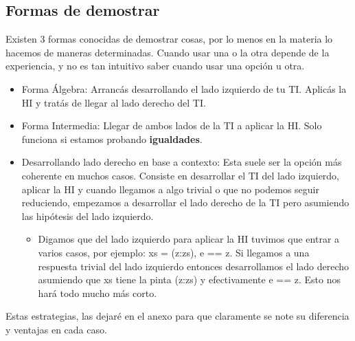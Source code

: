 \documentclass[10pt,a4paper]{article}
\begin{document}
\subsection*{Formas de demostrar}
Existen 3 formas conocidas de demostrar cosas, por lo menos en la materia lo hacemos de maneras determinadas. Cuando usar una o la otra depende de la experiencia, y no es tan intuitivo saber cuando usar una opción u otra. 
\begin{itemize}
    \item Forma Álgebra: Arrancás desarrollando el lado izquierdo de tu TI. Aplicás la HI y tratás de llegar al lado derecho del TI.
    \item Forma Intermedia: Llegar de ambos lados de la TI a aplicar la HI. Solo funciona si estamos probando \textbf{igualdades}.
    \item Desarrollando lado derecho en base a contexto: Esta suele ser la opción más coherente en muchos casos. Consiste en desarrollar el TI del lado izquierdo, aplicar la HI y cuando llegamos a algo trivial o que no podemos seguir reduciendo, empezamos a desarrollar el lado derecho de la TI pero asumiendo las hipótesis del lado izquierdo. 
    \begin{itemize}
        \item Digamos que del lado izquierdo para aplicar la HI tuvimos que entrar a varios casos, por ejemplo: xs = (z:zs), e == z. Si llegamos a una respuesta trivial del lado izquierdo entonces desarrollamos el lado derecho asumiendo que xs tiene la pinta (z:zs) y efectivamente e == z. Esto nos hará todo mucho más corto.  
    \end{itemize}
\end{itemize}
Estas estrategias, las dejaré en el anexo para que claramente se note su diferencia y ventajas en cada caso. 
\end{document}
